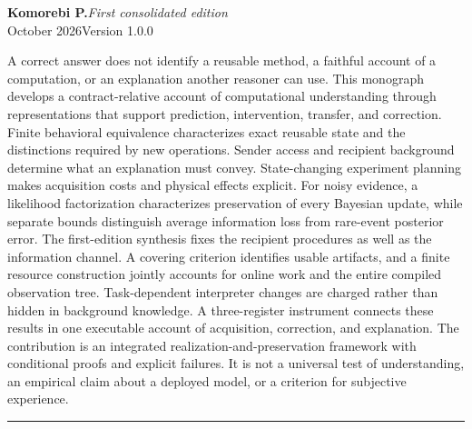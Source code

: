 \documentclass[11pt,letterpaper]{article}
\theoremstyle{plain}
\theoremstyle{definition}
\begin{document}
\hypersetup{pageanchor=false}
\begin{titlepage}
\thispagestyle{empty}
\vspace*{.25in}
\par
\vspace{.65in}
\vspace{.19in}
\vspace{.28in}
\noindent{\color{ink}\rule{\textwidth}{.85pt}}\par
\vspace{.16in}
\noindent\textbf{Komorebi P.}\hfill\textit{First consolidated edition}\\
 October 2026\hfill Version 1.0.0\par
\vspace{.46in}
\par\smallskip
\noindent A correct answer does not identify a reusable method, a faithful account of a computation, or an explanation another reasoner can use. This monograph develops a contract-relative account of computational understanding through representations that support prediction, intervention, transfer, and correction. Finite behavioral equivalence characterizes exact reusable state and the distinctions required by new operations. Sender access and recipient background determine what an explanation must convey. State-changing experiment planning makes acquisition costs and physical effects explicit. For noisy evidence, a likelihood factorization characterizes preservation of every Bayesian update, while separate bounds distinguish average information loss from rare-event posterior error. The first-edition synthesis fixes the recipient procedures as well as the information channel. A covering criterion identifies usable artifacts, and a finite resource construction jointly accounts for online work and the entire compiled observation tree. Task-dependent interpreter changes are charged rather than hidden in background knowledge. A three-register instrument connects these results in one executable account of acquisition, correction, and explanation. The contribution is an integrated realization-and-preservation framework with conditional proofs and explicit failures. It is not a universal test of understanding, an empirical claim about a deployed model, or a criterion for subjective experience.

\vfill
\noindent\rule{\textwidth}{.4pt}\par\smallskip
{}
\end{titlepage}
\end{document}
